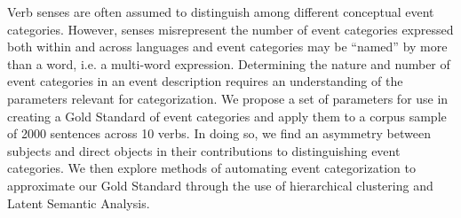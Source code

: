 Verb senses are often assumed to distinguish among different conceptual event categories. However, senses misrepresent the number of event categories expressed both within and across languages and event categories may be ``named'' by more than a word, i.e. a multi-word expression. Determining the nature and number of event categories in an event description requires an understanding of the parameters relevant for categorization. We propose a set of parameters for use in creating a Gold Standard of event categories and apply them to a corpus sample of 2000 sentences across 10 verbs. In doing so, we find an asymmetry between subjects and direct objects in their contributions to distinguishing event categories. We then explore methods of automating event categorization to approximate our Gold Standard through the use of hierarchical clustering and Latent Semantic Analysis.

